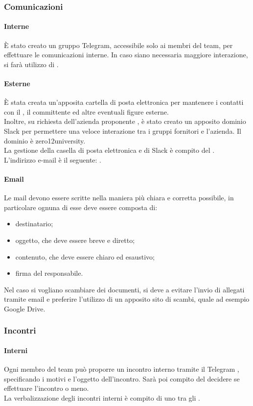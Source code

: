 \subsubsection{Comunicazioni}
 \paragraph{Interne}
 È stato creato un gruppo Telegram, accessibile solo ai membri del team, per effettuare le comunicazioni interne. In caso siano necessaria maggiore interazione, si farà utilizzo di . 
 \paragraph{Esterne}
 È stata creata un'apposita cartella di posta elettronica per mantenere i contatti con il , il committente ed altre eventuali figure esterne.\\
  Inoltre, su richiesta dell'azienda proponente \PROPONENTE, è stato creato un apposito dominio Slack per permettere una veloce interazione tra i gruppi fornitori e l'azienda. Il dominio è zero12university. \\
 La gestione della casella di posta elettronica e di Slack è compito del \RESP. \\
 L'indirizzo e-mail è il seguente: \EMAIL.
 \paragraph{Email}
 Le mail devono essere scritte nella maniera più chiara e corretta possibile, in particolare ognuna di esse deve essere composta di:
 \begin{itemize}
 	\item destinatario;
 	\item oggetto, che deve essere breve e diretto;
	\item contenuto, che deve essere chiaro ed esaustivo;
	\item firma del responsabile.
 \end{itemize}
 Nel caso si vogliano scambiare dei documenti, si deve a evitare l'invio di allegati tramite email e preferire l'utilizzo di un apposito sito di scambi, quale ad esempio Google Drive.
\subsubsection{Incontri}
 \paragraph{Interni}
 Ogni membro del team può proporre un incontro interno tramite il  Telegram , specificando i motivi e l'oggetto dell'incontro. 
 Sarà poi compito del \RESP{} decidere se effettuare l'incontro o meno.\\
  La verbalizzazione degli incontri interni è compito di uno tra gli \AMMP.
